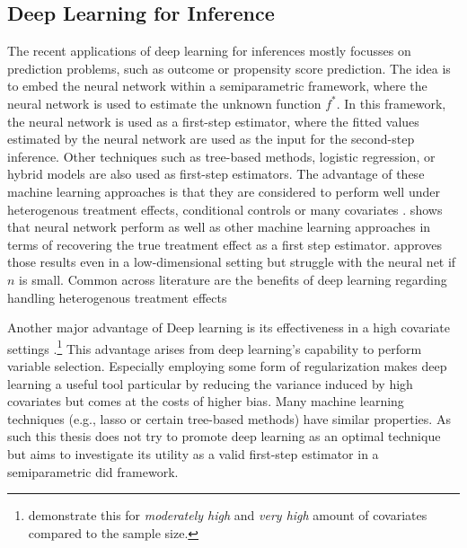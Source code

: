 \subsection{Deep Learning for Inference}
The recent applications of deep learning for inferences mostly focusses on prediction problems, such as outcome or propensity score prediction.
The idea is to embed the neural network within a semiparametric framework, where the neural network is used to estimate the unknown function $f^*$.
In this framework, the neural network is used as a first-step estimator, where the fitted values estimated by the neural network are used as the input for the second-step inference. %
Other techniques such as tree-based methods, logistic regression, or hybrid models are also used as first-step estimators.
The advantage of these machine learning approaches is that they are considered to perform well under heterogenous treatment effects, conditional controls or many covariates \citep{belloni2017program}.
\citet{belloni2017program} shows that neural network perform as well as other machine learning approaches in terms of recovering the true treatment effect as a first step estimator.
\citet{chernozhukovDoubleDebiasedMachine2018} approves those results even in a low-dimensional setting but struggle with the neural net if $n$ is small.
Common across literature are the benefits of deep learning regarding handling heterogenous treatment effects \citep[see][]{DeepLearningIndividual2021,belloni2017program,chernozhukovDoubleDebiasedMachine2018}

Another major advantage of Deep learning is its effectiveness in a high covariate settings \citep{chernozhukov2022automatic}.\footnote[3]{\citet{belloni2017program} demonstrate this for \textit{moderately high} and \textit{very high} amount of covariates compared to the sample size.}
This advantage arises from deep learning's capability to perform variable selection.
Especially employing some form of regularization makes deep learning a useful tool \citep{chernozhukovDoubleDebiasedMachine2018} particular by reducing the variance induced by high covariates but comes at the costs of higher bias.
Many machine learning techniques (e.g., lasso or certain tree-based methods) have similar properties.
As such this thesis does not try to promote deep learning as an optimal technique but aims to investigate its utility as a valid first-step estimator in a semiparametric \ac{did} framework.

